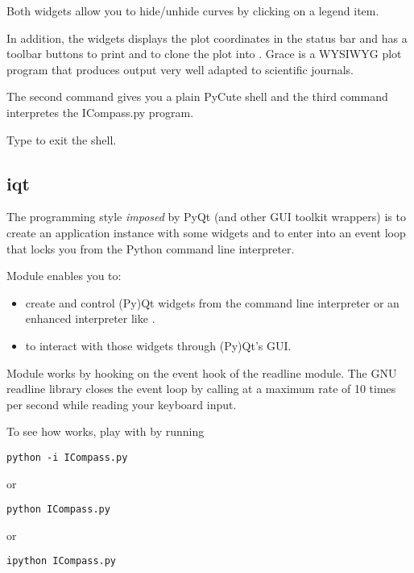 \documentclass{manual}
\begin{document}
Both widgets allow you to hide/unhide curves by clicking on a legend item.

In addition, the  widgets displays the plot coordinates in the
status bar and has a toolbar buttons to print and to clone the plot into
.
Grace is a WYSIWYG plot program that produces output very well adapted to
scientific journals.

The second command gives you a plain PyCute shell and the third command 
interpretes the ICompass.py program.

Type  to exit the shell.
 

\subsection{iqt \label{iqt-intro}}

The programming style \emph{imposed} by PyQt (and other GUI toolkit wrappers)
is to create an application instance with some widgets and to enter into an
event loop that locks you from the Python command line interpreter.

Module  enables you to:
\begin{itemize}
\item
  create and control (Py)Qt widgets from the command line interpreter or an
  enhanced interpreter like .
\item
  to interact with those widgets through (Py)Qt's GUI.
\end{itemize}

Module  works by hooking  on the
event hook of the readline module.
The GNU readline library closes the event loop by calling 
 at a maximum rate of 10 times per second
while reading your keyboard input.

To see how  works, play with  by running
\begin{verbatim}
python -i ICompass.py
\end{verbatim}
or
\begin{verbatim}
python ICompass.py
\end{verbatim}
or
\begin{verbatim}
ipython ICompass.py
\end{verbatim}
\end{document}
